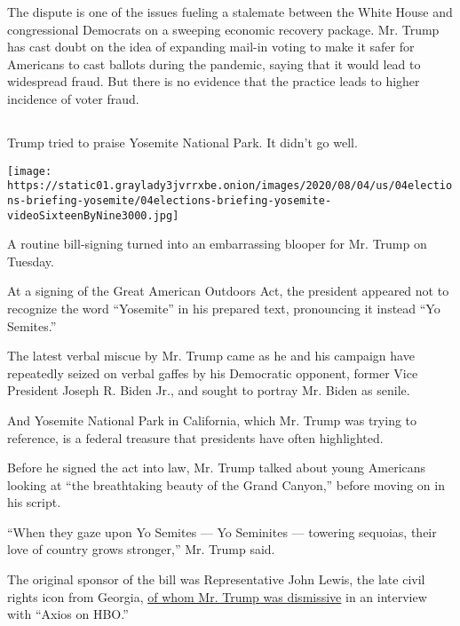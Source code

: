 The dispute is one of the issues fueling a stalemate between the White
House and congressional Democrats on a sweeping economic recovery
package. Mr. Trump has cast doubt on the idea of expanding mail-in
voting to make it safer for Americans to cast ballots during the
pandemic, saying that it would lead to widespread fraud. But there is no
evidence that the practice leads to higher incidence of voter fraud.

\hypertarget{-3}{%
\subsection{}\label{-3}}

Trump tried to praise Yosemite National Park. It didn't go well.

\texttt{[image: https://static01.graylady3jvrrxbe.onion/images/2020/08/04/us/04elections-briefing-yosemite/04elections-briefing-yosemite-videoSixteenByNine3000.jpg]}

A routine bill-signing turned into an embarrassing blooper for Mr. Trump
on Tuesday.

At a signing of the Great American Outdoors Act, the president appeared
not to recognize the word ``Yosemite'' in his prepared text, pronouncing
it instead ``Yo Semites.''

The latest verbal miscue by Mr. Trump came as he and his campaign have
repeatedly seized on verbal gaffes by his Democratic opponent, former
Vice President Joseph R. Biden Jr., and sought to portray Mr. Biden as
senile.

And Yosemite National Park in California, which Mr. Trump was trying to
reference, is a federal treasure that presidents have often highlighted.

Before he signed the act into law, Mr. Trump talked about young
Americans looking at ``the breathtaking beauty of the Grand Canyon,''
before moving on in his script.

``When they gaze upon Yo Semites --- Yo Seminites --- towering sequoias,
their love of country grows stronger,'' Mr. Trump said.

The original sponsor of the bill was Representative John Lewis, the late
civil rights icon from Georgia,
\href{https://www.nytimes3xbfgragh.onion/2020/08/04/us/politics/trump-john-lewis-axios.html}{of
whom Mr. Trump was dismissive} in an interview with ``Axios on HBO.''

\hypertarget{-4}{%
\subsection{}\label{-4}}


